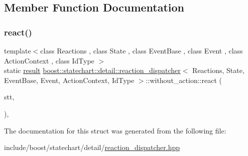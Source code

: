 \subsection{Member Function Documentation}
\mbox{\label{structboost_1_1statechart_1_1detail_1_1reaction__dispatcher_1_1without__action_ae8ebdf0a6a44e5072b6c08e22c95b078}} 
\subsubsection{\texorpdfstring{react()}{react()}}
{\footnotesize\ttfamily template$<$class Reactions , class State , class Event\+Base , class Event , class Action\+Context , class Id\+Type $>$ \\
static \mbox{\hyperlink{namespaceboost_1_1statechart_abe807f6598b614d6d87bb951ecd92331}{result}} \mbox{\hyperlink{classboost_1_1statechart_1_1detail_1_1reaction__dispatcher}{boost\+::statechart\+::detail\+::reaction\+\_\+dispatcher}}$<$ Reactions, State, Event\+Base, Event, Action\+Context, Id\+Type $>$\+::without\+\_\+action\+::react (\begin{DoxyParamCaption}\item[{State \&}]{stt,  }\item[{const Event\+Base \&}]{ }\end{DoxyParamCaption})\hspace{0.3cm}{\ttfamily [inline]}, {\ttfamily [static]}}



The documentation for this struct was generated from the following file\+:\begin{DoxyCompactItemize}
\item 
include/boost/statechart/detail/\mbox{\hyperlink{reaction__dispatcher_8hpp}{reaction\+\_\+dispatcher.\+hpp}}\end{DoxyCompactItemize}
